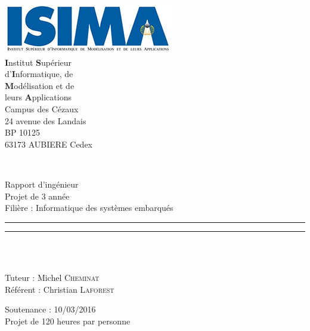
\begin{titlepage}
   \noindent
   \begin{minipage}{.45\textwidth}
      \includegraphics[width=.8\textwidth]{img/logo_isima.png}
      \\[.5cm]
      \textbf{I}nstitut \textbf{S}upérieur \\
      d'\textbf{I}nformatique, de \\
      \textbf{M}odélisation et de \\
      leurs \textbf{A}pplications
      \\[.5cm]
      \footnotesize
      Campus des Cézaux \\
      24 avenue des Landais \\
      BP 10125 \\
      63173 AUBIERE Cedex
   \end{minipage}
   \hspace{.03\textwidth}
   \\[.5cm]
   \begin{center}
      Rapport d'ingénieur \\
      Projet de 3\ieme{} année \\
      Filière : Informatique des systèmes embarqués
      \rule{\textwidth}{.3pt}
      \LARGE \textbf{\textsc{\@title}}
      \rule{\textwidth}{.3pt}
      \hbox{\vspace{3cm}} \\
   \end{center}
   {\large \textbf{\@author}}
   \\[.5cm]
   Tuteur : Michel \textsc{Cheminat} \\
   Référent : Christian \textsc{Laforest} \\
   \begin{flushright}
      \footnotesize
      Soutenance : 10/03/2016 \\
      Projet de 120 heures par personne
   \end{flushright}
\end{titlepage}

